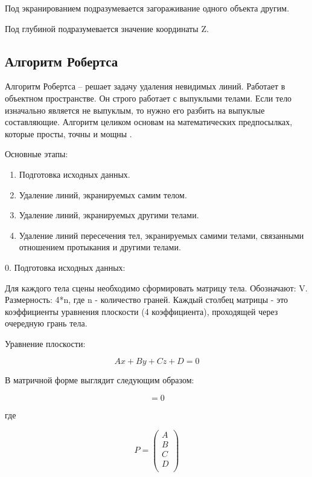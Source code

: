 Под экранированием подразумевается загораживание одного объекта другим.

Под глубиной подразумевается значение координаты Z.

\subsection{Алгоритм Робертса}

Алгоритм Робертса -- решает задачу удаления невидимых линий. Работает в объектном пространстве. Он строго работает с выпуклыми телами. Если тело изначально является не выпуклым, то нужно его разбить на выпуклые составляющие. Алгоритм целиком основам на математических предпосылках, которые просты, точны и мощны \cite{bib1}.

Основные этапы:
\begin{enumerate}
	\item Подготовка исходных данных.
	\item Удаление линий, экранируемых самим телом.
	\item Удаление линий, экранируемых другими телами.
	\item Удаление линий пересечения тел, экранируемых самими телами, связанными отношением протыкания и другими телами.
\end{enumerate}

0. Подготовка исходных данных:

Для каждого тела сцены необходимо сформировать матрицу тела. Обозначают: V. Размерность: 4*n, где n - количество граней. Каждый столбец матрицы - это коэффициенты уравнения плоскости (4 коэффициента), проходящей через очередную грань тела.

Уравнение плоскости:

\begin{equation}
	Ax + By + Cz + D = 0
\end{equation}

В матричной форме выглядит следующим образом:

\begin{equation}
	[x\;y\;z\;1][P] = 0
\end{equation}

где 

\begin{equation}
	P = \left(
	\begin{array}{c}
			A \\
			B \\
			C \\
			D \\
		\end{array}
	\right)
\end{equation}

